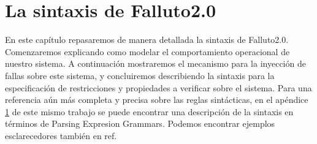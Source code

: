 \documentclass[titlepage, 12pt]{book}
\begin{document}


\chapter{La sintaxis de Falluto2.0}

En este cap\'itulo repasaremos de manera detallada la sintaxis de Falluto2.0. Comenzaremos explicando como modelar el comportamiento operacional de nuestro sistema. A continuaci\'on mostraremos el mecanismo para la inyecci\'on de fallas sobre este sistema, y concluiremos describiendo la sintaxis para la especificaci\'on de restricciones y propiedades a verificar sobre el sistema. Para una referencia a\'un m\'as completa y precisa sobre las reglas sint\'acticas, en el ap\'endice \ref{} de este mismo trabajo se puede encontrar una descripci\'on de la sintaxis en t\'erminos de Parsing Expresion Grammars. Podemos encontrar ejemplos esclarecedores tambi\'en en ref{}.
\end{document}
